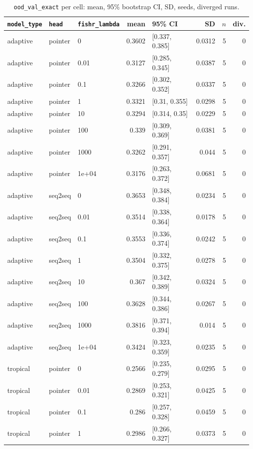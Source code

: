 \documentclass[10pt]{article}
\begin{document}
{\small
\begin{longtable}{lllrlrrr}
\caption{\texttt{ood\_val\_exact} per cell: mean, 95\% bootstrap CI, SD, seeds, diverged runs.}\label{tab:summary-ood_val_exact}\\
\toprule
\texttt{model\_type} & \texttt{head} & \texttt{fishr\_lambda} & mean & 95\% CI & SD & $n$ & div.\\
\midrule
\endhead
adaptive & pointer & 0 & 0.3602 & [0.337, 0.385] & 0.0312 & 5 & 0\\
adaptive & pointer & 0.01 & 0.3127 & [0.285, 0.345] & 0.0387 & 5 & 0\\
adaptive & pointer & 0.1 & 0.3266 & [0.302, 0.352] & 0.0337 & 5 & 0\\
adaptive & pointer & 1 & 0.3321 & [0.31, 0.355] & 0.0298 & 5 & 0\\
adaptive & pointer & 10 & 0.3294 & [0.314, 0.35] & 0.0229 & 5 & 0\\
adaptive & pointer & 100 & 0.339 & [0.309, 0.369] & 0.0381 & 5 & 0\\
adaptive & pointer & 1000 & 0.3262 & [0.291, 0.357] & 0.044 & 5 & 0\\
adaptive & pointer & 1e+04 & 0.3176 & [0.263, 0.372] & 0.0681 & 5 & 0\\
adaptive & seq2seq & 0 & 0.3653 & [0.348, 0.384] & 0.0234 & 5 & 0\\
adaptive & seq2seq & 0.01 & 0.3514 & [0.338, 0.364] & 0.0178 & 5 & 0\\
adaptive & seq2seq & 0.1 & 0.3553 & [0.336, 0.374] & 0.0242 & 5 & 0\\
adaptive & seq2seq & 1 & 0.3504 & [0.332, 0.375] & 0.0278 & 5 & 0\\
adaptive & seq2seq & 10 & 0.367 & [0.342, 0.389] & 0.0324 & 5 & 0\\
adaptive & seq2seq & 100 & 0.3628 & [0.344, 0.386] & 0.0267 & 5 & 0\\
adaptive & seq2seq & 1000 & 0.3816 & [0.371, 0.394] & 0.014 & 5 & 0\\
adaptive & seq2seq & 1e+04 & 0.3424 & [0.323, 0.359] & 0.0235 & 5 & 0\\
tropical & pointer & 0 & 0.2566 & [0.235, 0.279] & 0.0295 & 5 & 0\\
tropical & pointer & 0.01 & 0.2869 & [0.253, 0.321] & 0.0425 & 5 & 0\\
tropical & pointer & 0.1 & 0.286 & [0.257, 0.328] & 0.0459 & 5 & 0\\
tropical & pointer & 1 & 0.2986 & [0.266, 0.327] & 0.0373 & 5 & 0\\

\end{longtable}}
\end{document}

